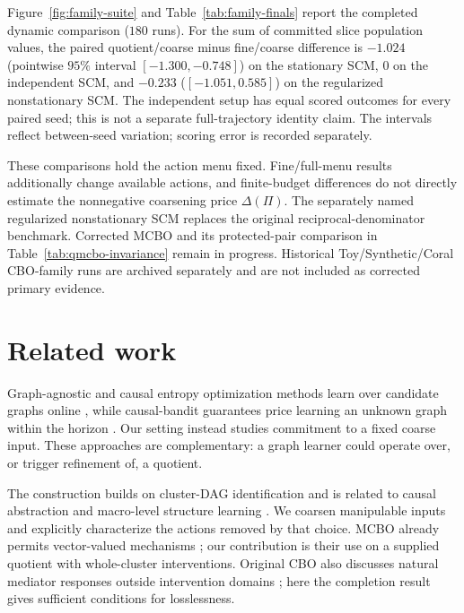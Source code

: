 \documentclass[twoside]{article}
\begin{document}
Figure~\ref{fig:family-suite} and Table~\ref{tab:family-finals} report the completed dynamic comparison ($180$ runs). For the sum of committed slice population values, the paired quotient/coarse minus fine/coarse difference is $-1.024$ (pointwise $95\%$ interval $[-1.300,-0.748]$) on the stationary SCM, $0$ on the independent SCM, and $-0.233$ ($[-1.051,0.585]$) on the regularized nonstationary SCM. The independent setup has equal scored outcomes for every paired seed; this is not a separate full-trajectory identity claim. The intervals reflect between-seed variation; scoring error is recorded separately.

These comparisons hold the action menu fixed. Fine/full-menu results additionally change available actions, and finite-budget differences do not directly estimate the nonnegative coarsening price $\Delta(\Pi)$. The separately named regularized nonstationary SCM replaces the original reciprocal-denominator benchmark. Corrected MCBO and its protected-pair comparison in Table~\ref{tab:qmcbo-invariance} remain in progress. Historical Toy/Synthetic/Coral CBO-family runs are archived separately and are not included as corrected primary evidence.


\begin{table}[t]
  \centering
  \caption{Sum of committed dynamic slice population values (lower is better), mean $\pm$ pointwise $95\%$ Student-$t$ half-width across $20$ seeds. Full-menu fine results and the two matched coarse-menu methods are separated. These are sequential-policy outcomes, not regret relative to a known optimum.}
  \label{tab:family-finals}
  \small
\end{table}


\section{Related work}
\label{sec:related}

Graph-agnostic and causal entropy optimization methods learn over candidate graphs online \citep{mukherjeeGraphAgnosticCausal2024,branchiniCausalEntropyOptimization2023}, while causal-bandit guarantees price learning an unknown graph within the horizon \citep{luCausalBanditsUnknown2021}. Our setting instead studies commitment to a fixed coarse input. These approaches are complementary: a graph learner could operate over, or trigger refinement of, a quotient.

The construction builds on cluster-DAG identification \citep{CausalEffectIdentification} and is related to causal abstraction and macro-level structure learning \citep{beckersAbstractingCausalModels2019,madaleno2026a}. We coarsen manipulable inputs and explicitly characterize the actions removed by that choice. MCBO already permits vector-valued mechanisms \citep{sussexMODELBASEDCAUSALBAYESIAN2023}; our contribution is their use on a supplied quotient with whole-cluster interventions. Original CBO also discusses natural mediator responses outside intervention domains \citep{agliettiCausalBayesianOptimization2020b}; here the completion result gives sufficient conditions for losslessness.
\end{document}
